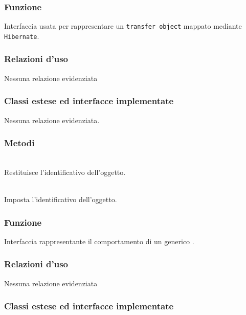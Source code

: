 
\subsubsection*{Funzione}
Interfaccia usata per rappresentare un \texttt{transfer object} mappato mediante \texttt{Hibernate}.

\subsubsection*{Relazioni d'uso}

Nessuna relazione evidenziata

\subsubsection*{Classi estese ed interfacce implementate}

Nessuna relazione evidenziata.

\subsubsection*{Metodi}
\begin{description}
	\item{}\\
	Restituisce l'identificativo dell'oggetto.
	\item{}\\
	Imposta l'identificativo dell'oggetto.
\end{description}


\subsubsection*{Funzione}
Interfaccia rappresentante il comportamento di un generico .

\subsubsection*{Relazioni d'uso}

Nessuna relazione evidenziata

\subsubsection*{Classi estese ed interfacce implementate}

